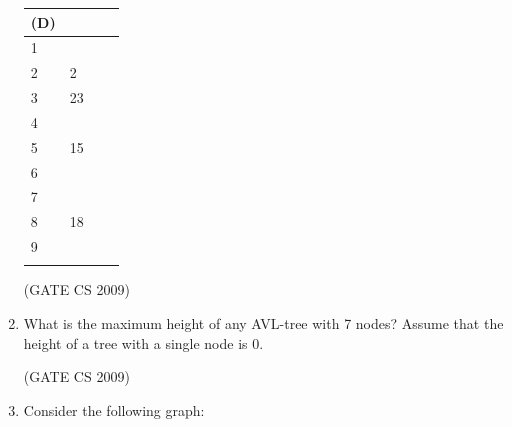 \documentclass[a4paper, 11pt]{article}
\begin{document}
\begin{enumerate}
\begin{tabularx}{\textwidth}{@{}XXXX@{}}
        (D) \begin{tabular}{|c|c|}
            \hline
            0 &  \\
            \hline
            1 &   \\
            \hline
            2 & 2 \\
            \hline
            3 & 23\\
            \hline
            4 &   \\
            \hline
            5 & 15\\
            \hline
            6 &   \\
            \hline
            7 &   \\
            \hline
            8 & 18\\
            \hline
            9 &   \\
            \hline
            \end{tabular}
        
            
    \end{tabularx}

    \hfill (GATE CS 2009)

    \item What is the maximum height of any AVL-tree with 7 nodes? Assume that the height of a tree with a single node is 0.\\
    \begin{enumerate}
    \end{enumerate}


    \hfill (GATE CS 2009)

    \item Consider the following graph:\\


\end{enumerate}
\end{document}
